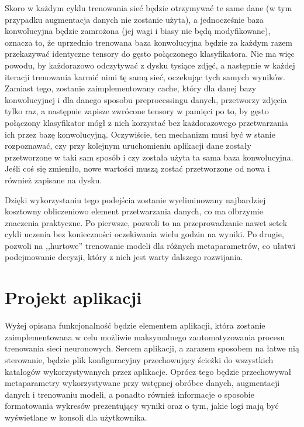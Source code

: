 Skoro w każdym cyklu trenowania sieć będzie otrzymywać te same dane (w tym przypadku augmentacja danych nie zostanie użyta), a jednocześnie baza konwolucyjna będzie zamrożona (jej wagi i biasy nie będą modyfikowane), oznacza to, że uprzednio trenowana baza konwolucyjna będzie za każdym razem przekazywać identyczne tensory do gęsto połączonego klasyfikatora. Nie ma więc powodu, by każdorazowo odczytywać z dysku tysiące zdjęć, a następnie w każdej iteracji trenowania karmić nimi tę samą sieć, oczekując tych samych wyników. Zamiast tego, zostanie zaimplementowany cache, który dla danej bazy konwolucyjnej i dla danego sposobu preprocessingu danych, przetworzy zdjęcia tylko raz, a następnie zapisze zwrócone tensory w pamięci po to, by gęsto połączony klasyfikator mógł z nich korzystać bez każdorazowego przetwarzania ich przez bazę konwolucyjną. Oczywiście, ten mechanizm musi być w stanie rozpoznawać, czy przy kolejnym uruchomieniu aplikacji dane zostały przetworzone w taki sam sposób i czy została użyta ta sama baza konwolucyjna. Jeśli coś się zmieniło, nowe wartości muszą zostać przetworzone od nowa i również zapisane na dysku.

Dzięki wykorzystaniu tego podejścia zostanie wyeliminowany najbardziej kosztowny obliczeniowo element przetwarzania danych, co ma olbrzymie znaczenia praktyczne. Po pierwsze, pozwoli to na przeprowadzanie nawet setek cykli uczenia bez konieczności oczekiwania wielu godzin na wyniki. Po drugie, pozwoli na ,,hurtowe'' trenowanie modeli dla różnych metaparametrów, co ułatwi podejmowanie decyzji, który z nich jest warty dalszego rozwijania.


\section{Projekt aplikacji}
Wyżej opisana funkcjonalność będzie elementem aplikacji, która zostanie zaimplementowana w celu możliwie maksymalnego zautomatyzowania procesu trenowania sieci neuronowych. Sercem aplikacji, a zarazem sposobem na łatwe nią sterowanie, będzie plik konfiguracyjny przechowujący ścieżki do wszystkich katalogów wykorzystywanych przez aplikacje. Oprócz tego będzie przechowywał metaparametry wykorzystywane przy wstępnej obróbce danych, augmentacji danych i trenowaniu modeli, a ponadto również informacje o sposobie formatowania wykresów prezentujący wyniki oraz o tym, jakie logi mają być wyświetlane w konsoli dla użytkownika.

